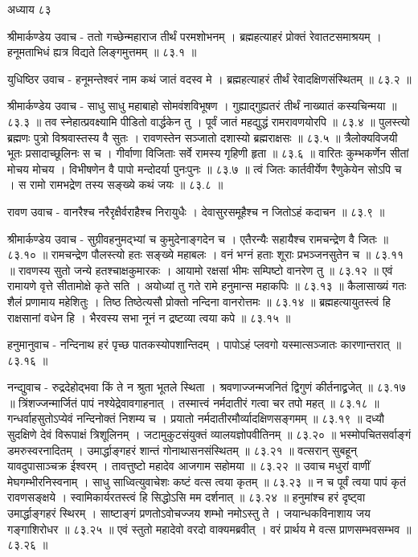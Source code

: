 अध्याय ८३

श्रीमार्कण्डेय उवाच -
ततो गच्छेन्महाराज तीर्थं परमशोभनम् ।
ब्रह्महत्याहरं प्रोक्तं रेवातटसमाश्रयम् ।
हनूमताभिधं ह्यत्र विद्यते लिङ्गमुत्तमम् ॥ ८३.१ ॥

युधिष्ठिर उवाच -
हनूमन्तेश्वरं नाम कथं जातं वदस्व मे ।
ब्रह्महत्याहरं तीर्थं रेवादक्षिणसंस्थितम् ॥ ८३.२ ॥

श्रीमार्कण्डेय उवाच -
साधु साधु महाबाहो सोमवंशविभूषण ।
गुह्याद्गुह्यतरं तीर्थं नाख्यातं कस्यचिन्मया ॥ ८३.३ ॥
तव स्नेहात्प्रवक्ष्यामि पीडितो वार्द्धकेन तु ।
पूर्वं जातं महद्युद्धं रामरावणयोरपि ॥ ८३.४ ॥
पुलस्त्यो ब्रह्मणः पुत्रो विश्रवास्तस्य वै सुतः ।
रावणस्तेन सञ्जातो दशास्यो ब्रह्मराक्षसः ॥ ८३.५ ॥
त्रैलोक्यविजयी भूतः प्रसादाच्छूलिनः स च ।
गीर्वाणा विजिताः सर्वे रामस्य गृहिणी हृता ॥ ८३.६ ॥
वारितः कुम्भकर्णेन सीतां मोचय मोचय ।
विभीषणेन वै पापो मन्दोदर्या पुनःपुनः ॥ ८३.७ ॥
त्वं जितः कार्तवीर्येण रैणुकेयेन सोऽपि च ।
स रामो रामभद्रेण तस्य सङ्ख्ये कथं जयः ॥ ८३.८ ॥

रावण उवाच -
वानरैश्च नरैरृक्षैर्वराहैश्च निरायुधैः ।
देवासुरसमूहैश्च न जितोऽहं कदाचन ॥ ८३.९ ॥

श्रीमार्कण्डेय उवाच -
सुग्रीवहनुमद्भ्यां च कुमुदेनाङ्गदेन च ।
एतैरन्यैः सहायैश्च रामचन्द्रेण वै जितः ॥ ८३.१० ॥
रामचन्द्रेण पौलस्त्यो हतः सङ्ख्ये महाबलः ।
वनं भग्नं हताः शूराः प्रभञ्जनसुतेन च ॥ ८३.११ ॥
रावणस्य सुतो जन्ये हतश्चाक्षकुमारकः ।
आयामो रक्षसां भीमः सम्पिष्टो वानरेण तु ॥ ८३.१२ ॥
एवं रामायणे वृत्ते सीतामोक्षे कृते सति ।
अयोध्यां तु गते रामे हनुमान्स महाकपिः ॥ ८३.१३ ॥
कैलासाख्यं गतः शैलं प्रणामाय महेशितुः ।
तिष्ठ तिष्ठेत्यसौ प्रोक्तो नन्दिना वानरोत्तमः ॥ ८३.१४ ॥
ब्रह्महत्यायुतस्त्वं हि राक्षसानां वधेन हि ।
भैरवस्य सभा नूनं न द्रष्टव्या त्वया कपे ॥ ८३.१५ ॥

हनुमानुवाच -
नन्दिनाथ हरं पृच्छ पातकस्योपशान्तिदम् ।
पापोऽहं प्लवगो यस्मात्सञ्जातः कारणान्तरात् ॥ ८३.१६ ॥

नन्द्युवाच -
रुद्रदेहोद्भवा किं ते न श्रुता भूतले स्थिता ।
श्रवणाज्जन्मजनितं द्विगुणं कीर्तनाद्व्रजेत् ॥ ८३.१७ ॥
त्रिंशज्जन्मार्जितं पापं नश्येद्रेवावगाहनात् ।
तस्मात्त्वं नर्मदातीरं गत्वा चर तपो महत् ॥ ८३.१८ ॥
गन्धर्वाहसुतोऽप्येवं नन्दिनोक्तं निशम्य च ।
प्रयातो नर्मदातीरमौर्व्यादक्षिणसङ्गमम् ॥ ८३.१९ ॥
दध्यौ सुदक्षिणे देवं विरूपाक्षं त्रिशूलिनम् ।
जटामुकुटसंयुक्तं व्यालयज्ञोपवीतिनम् ॥ ८३.२० ॥
भस्मोपचितसर्वाङ्गं डमरुस्वरनादितम् ।
उमार्द्धाङ्गहरं शान्तं गोनाथासनसंस्थितम् ॥ ८३.२१ ॥
वत्सरान् सुबहून् यावदुपासाञ्चक्र ईश्वरम् ।
तावत्तुष्टो महादेव आजगाम सहोमया ॥ ८३.२२ ॥
उवाच मधुरां वाणीं मेघगम्भीरनिस्वनाम् ।
साधु साध्वित्युवाचेशः कष्टं वत्स त्वया कृतम् ॥ ८३.२३ ॥
न च पूर्वं त्वया पापं कृतं रावणसङ्क्षये ।
स्वामिकार्यरतस्त्वं हि सिद्धोऽसि मम दर्शनात् ॥ ८३.२४ ॥
हनुमांश्च हरं दृष्ट्वा उमार्द्धाङ्गहरं स्थिरम् ।
साष्टाङ्गं प्रणतोऽवोचज्जय शम्भो नमोऽस्तु ते ।
जयान्धकविनाशाय जय गङ्गाशिरोधर ॥ ८३.२५ ॥
एवं स्तुतो महादेवो वरदो वाक्यमब्रवीत् ।
वरं प्रार्थय मे वत्स प्राणसम्भवसम्भव ॥ ८३.२६ ॥

